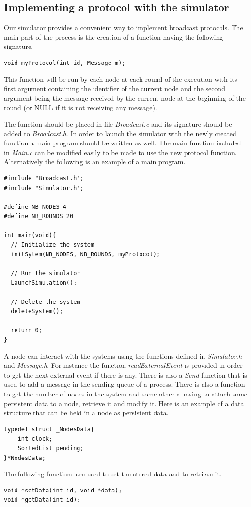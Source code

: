 \documentclass[a4paper]{article}
\begin{document}
\subsection{Implementing a protocol with the simulator}
Our simulator provides a convenient way to implement broadcast protocols. The
main part of the process is the creation of a function having the following
signature.
\begin{verbatim}
void myProtocol(int id, Message m);
\end{verbatim}

This function will be run by each node at each round of the execution with its
first argument containing the identifier of the current node and the second
argument being the message received by the current node at the beginning of the
round (or NULL if it is not receiving any message).

The function should be placed in file \textit{Broadcast.c} and its signature
should be added to \textit{Broadcast.h}. In order to launch the simulator with
the newly created function a main program should be written as well. The main
function included in \textit{Main.c} can be modified easily to be made to use
the new protocol function. Alternatively the following is an example of a
main program.

\begin{verbatim}
#include "Broadcast.h";
#include "Simulator.h";

#define NB_NODES 4
#define NB_ROUNDS 20

int main(void){
  // Initialize the system
  initSytem(NB_NODES, NB_ROUNDS, myProtocol);

  // Run the simulator
  LaunchSimulation();

  // Delete the system
  deleteSystem();

  return 0;
}
\end{verbatim}

A node can interact with the systems using the functions defined in
\textit{Simulator.h} and \textit{Message.h}. For instance the function
\textit{readExternalEvent} is provided in order to get the next external
event if there is any. There is also a \textit{Send} function that is used to
add a message in the sending queue of a process. There is also a function
to get the number of nodes in the system and some other allowing to attach
some persistent data to a node, retrieve it and modify it. Here is an example
of a data structure that can be held in a node as persistent data.
\begin{verbatim}
typedef struct _NodesData{
    int clock;
    SortedList pending;
}*NodesData;
\end{verbatim}
The following functions are used to set the stored data and to retrieve it.
\begin{verbatim}
void *setData(int id, void *data);
void *getData(int id);
\end{verbatim}
\end{document}
